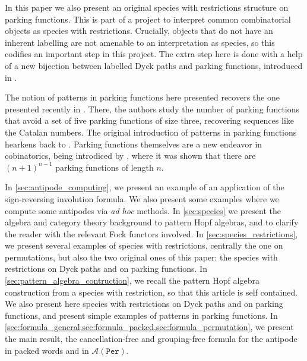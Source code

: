 \documentclass[12pt, reqno]{amsart}
\theoremstyle{definition}
\begin{document}
In this paper we also present an original species with restrictions structure on parking functions.
This is part of a project to interpret common combinatorial objects as species with restrictions.
Crucially, objects that do not have an inherent labelling are not amenable to an interpretation as species, so this codifies an important step in this project.
The extra step here is done with a help of a new bijection between labelled Dyck paths and parking functions, introduced in \cite{BGLPV2021}.

The notion of patterns in parking functions here presented recovers the one presented recently in \cite{adeniran2022pattern}.
There, the authors study the number of parking functions that avoid a set of five parking functions of size three, recovering sequences like the Catalan numbers.
The original introduction of patterns in parking functions hearkens back to \cite{qiu2018patterns}.
Parking functions themselves are a new endeavor in cobinatorics, being introdiced by \cite{konheim1966occupancy}, where it was shown that there are $(n+1)^{n-1}$ parking functions of length $n$.


In \cref{sec:antipode_computing}, we present an example of an application of the sign-reversing involution formula.
We also present some examples where we compute some antipodes via \textit{ad hoc} methods.
In \cref{sec:species} we present the algebra and category theory background to pattern Hopf algebras, and to clarify the reader with the relevant Fock functors involved.
In \cref{sec:species_restrictions}, we present several examples of species with restrictions, centrally the one on permutations, but also the two original ones of this paper: the species with restrictions on Dyck paths and on parking functions.
In \cref{sec:pattern_algebra_contruction}, we recall the pattern Hopf algebra construction from a species with restriction, so that this article is self contained.
We also present here species with restrictions on Dyck paths and on parking functions, and present simple examples of patterns in parking functions.
In \cref{sec:formula_general,sec:formula_packed,sec:formula_permutation}, we present the main result, the cancellation-free and grouping-free formula for the antipode in packed words and in $\mathcal{A}(\mathtt{Per})$.
\end{document}
